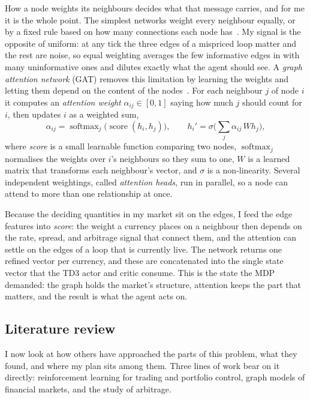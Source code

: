 \documentclass[12pt,a4paper]{article}
\begin{document}
How a node weights its neighbours decides what that message carries, and for me it is the whole
point. The simplest networks weight every neighbour equally, or by a fixed rule based on how many
connections each node has~\citep{kipf2017gcn}. My signal is the opposite of uniform: at any tick
the three edges of a mispriced loop matter and the rest are noise, so equal weighting averages
the few informative edges in with many uninformative ones and dilutes exactly what the agent
should see. A \emph{graph attention network} (GAT) removes this limitation by learning the
weights and letting them depend on the content of the
nodes~\citep{velickovic2018gat,brody2022gatv2}. For each neighbour $j$ of node $i$ it computes an
\emph{attention weight} $\alpha_{ij}\in[0,1]$ saying how much $j$ should count for $i$, then
updates $i$ as a weighted sum,
\begin{equation}
\alpha_{ij}=\operatorname{softmax}_j\big(\operatorname{score}(h_i,h_j)\big),\qquad
h_i'=\sigma\Big(\textstyle\sum_{j}\alpha_{ij}\,W h_j\Big),
\label{eq:gat}
\end{equation}
where \emph{score} is a small learnable function comparing two nodes, $\operatorname{softmax}_j$
normalises the weights over $i$'s neighbours so they sum to one, $W$ is a learned matrix that
transforms each neighbour's vector, and $\sigma$ is a non-linearity. Several independent
weightings, called \emph{attention heads}, run in parallel, so a node can attend to more than one
relationship at once.

Because the deciding quantities in my market sit on the edges, I feed the edge features into
\emph{score}: the weight a currency places on a neighbour then depends on the rate, spread, and
arbitrage signal that connect them, and the attention can settle on the edges of a loop that is
currently live. The network returns one refined vector per currency, and these are concatenated
into the single state vector that the TD3 actor and critic consume. This is the state the MDP
demanded: the graph holds the market's structure, attention keeps the part that matters, and the
result is what the agent acts on.

\subsection{Literature review}
\label{sub:litreview}

I now look at how others have approached the parts of this problem, what they found, and
where my plan sits among them. Three lines of work bear on it directly: reinforcement
learning for trading and portfolio control, graph models of financial markets, and the study
of arbitrage.
\end{document}
